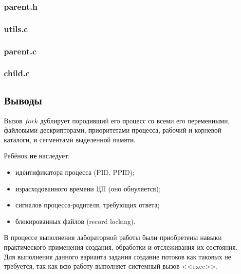 \documentclass[12pt]{article}
\begin{document}
	\subsubsection*{parent.h}
	
	
	
	\subsubsection{utils.c}
	
	
	
	\subsubsection*{parent.c}
	
	
	
	\subsubsection*{child.c}
	
	
	
	\subsection*{Выводы}
	
	Вызов $fork$ дублирует породивший его процесс со всеми его переменными, файловыми дескрипторами, приоритетами процесса, рабочий и корневой каталоги, и сегментами выделенной памяти.
	
	Ребёнок {\bf не} наследует:
	\begin{itemize}
		\item идентификатора процесса (PID, PPID);
		\item израсходованного времени ЦП (оно обнуляется);
		\item сигналов процесса-родителя, требующих ответа;
		\item блокированных файлов (record locking).
	\end{itemize}
	
	В процессе выполнения лабораторной работы были приобретены навыки практического применения создания, обработки и отслеживания их состояния. Для выполнения данного варианта задания создание потоков как таковых не требуется, так как всю работу выполняет системный вызов <<exec>>.
	
\end{document}
